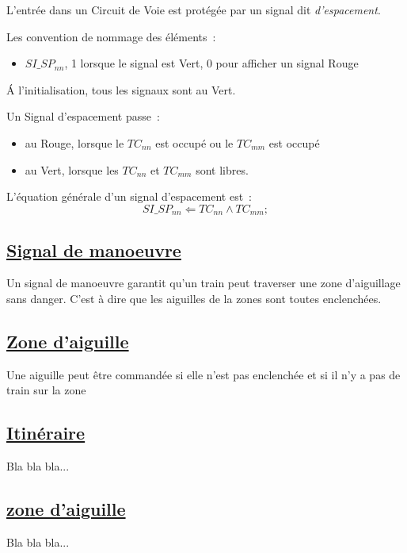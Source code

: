 L'entrée dans un Circuit de Voie est protégée par un signal dit
\emph{d'espacement}.

Les convention de nommage des éléments~:
\begin{itemize}
\item $SI\_SP_{nn}$, 1 lorsque le signal est Vert, 0 pour afficher un
  signal Rouge
\end{itemize}

\'A l'initialisation, tous les signaux sont au Vert.

Un Signal d'espacement passe~:
\begin{itemize}
\item au Rouge, lorsque le $TC_{nn}$ est occupé ou le $TC_{mm}$ est occupé
\item au Vert, lorsque les $TC_{nn}$ et $TC_{mm}$ sont libres.
\end{itemize}

\medskip
L'équation générale d'un signal d'espacement est~:
$$\boxed{
  SI\_SP_{nn} \Leftarrow TC_{nn} \land TC_{mm};
}$$


\subsection{\underline{Signal de manoeuvre}}
\label{sec:esp}

Un signal de manoeuvre garantit qu'un train peut traverser une zone
d'aiguillage sans danger. C'est à dire que les aiguilles de la zones
sont toutes enclenchées.




\subsection{\underline{Zone d'aiguille}}
\label{sec:aig}

Une aiguille peut être commandée si elle n'est pas enclenchée et si il
n'y a pas de train sur la zone


\subsection{\underline{Itinéraire}}
\label{sec:iti}

Bla bla bla...

\subsection{\underline{zone d'aiguille}}
\label{sec:aig}

Bla bla bla...



\newpage





